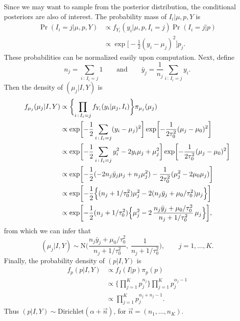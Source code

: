 \documentclass[11pt]{article}
\begin{document}
Since we may want to sample from the posterior distribution,
the conditional posteriors are also of interest.
The probability mass of $I_i \vert \mu, p, Y$ is
\begin{align*}
    \Pr(I_i = j \vert \mu, p, Y)
    &\propto
    f_{Y_i}(y_i \vert \mu, p, I_i = j) \Pr(I_i = j \vert p)
    \\ &\propto
    \exp \biggl[ -\frac{1}{2} (y_i - \mu_j)^2 \biggr] p_j.
\end{align*}
These probabilities can be normalized easily upon computation.
Next, define
\[
    n_j = \sum_{i \,:\, I_i = j} 1
    \qquad\text{and}\qquad
    \bar{y}_j = \frac{1}{n_j} \sum_{i \,:\, I_i = j} y_i.
\]
Then the density of $(\mu_j \vert I, Y)$ is
\begin{align*}
    f_{\mu_j}(\mu_j \vert I, Y)
    &\propto
    \biggl\{ 
        \prod_{i \,:\, I_i = j} f_{Y_i}(y_i \vert \mu_j, I_i)
    \biggr\}
    \pi_{\mu_j}(\mu_j)
    \\ &\propto
    \exp\biggl[ 
        -\frac{1}{2} \sum_{i \,:\, I_i = j} (y_i - \mu_j)^2 
    \biggr]
    \exp\biggl[
        -\frac{1}{2\tau_0^2} (\mu_j - \mu_0)^2
    \biggr]
    \\ &\propto
    \exp\biggl[ 
        -\frac{1}{2} \sum_{i \,:\, I_i = j} y_i^2 - 2y_i\mu_j + \mu_j^2 
    \biggr]
    \exp\biggl[
        -\frac{1}{2\tau_0^2} (\mu_j - \mu_0)^2
    \biggr]
    \\ &\propto
    \exp\biggl[ 
        -\frac{1}{2}(-2n_j \bar{y}_j\mu_j + n_j \mu_j^2)
        -\frac{1}{2\tau_0^2} (\mu_j^2 - 2 \mu_0\mu_j)
    \biggr]
    \\ &\propto
    \exp\biggl[
        -\frac{1}{2}
        \Bigl\{
        (n_j + 1 / \tau_0^2) \mu_j^2 
        - 2(n_j\bar{y}_j + \mu_0 / \tau_0^2)\mu_j
        \Bigr\}
    \biggr]
    \\ &\propto
    \exp\biggl[
        -\frac{1}{2} (n_j + 1 / \tau_0^2)
        \Bigl\{
        \mu_j^2 
        -2\,\frac{n_j\bar{y}_j + \mu_0 / \tau_0^2}{n_j + 1 / \tau_0^2} \,\mu_j
        \Bigr\}
    \biggr],
\end{align*}
from which we can infer that
\[
    (\mu_j \vert I, Y)
    \sim
    \textrm{N} \biggl(
        \frac{n_j\bar{y}_j + \mu_0 / \tau_0^2}{n_j + 1 / \tau_0^2}, \
        \frac{1}{n_j + 1 / \tau_0^2}
    \biggr),
    \qquad
    j = 1, \ldots, K.
\]
Finally, the probability density of $(p \vert I, Y)$ is
\begin{align*}
    f_p(p \vert I, Y)
    &\propto
    f_{I}(I \vert p) \pi_p(p)
    \\ &\propto
    \biggl\{ \prod_{j=1}^K p_j^{n_j} \biggr\}
    \prod_{j=1}^K p_j^{\alpha_j - 1}
    \\ &\propto
    \prod_{j=1}^K p_j^{\alpha_j + n_j - 1}.
\end{align*}
Thus $(p \vert I, Y) \sim \textrm{Dirichlet}(\alpha + \vec{n})$,
for $\vec{n} = (n_1, \ldots, n_K)$.
\end{document}
